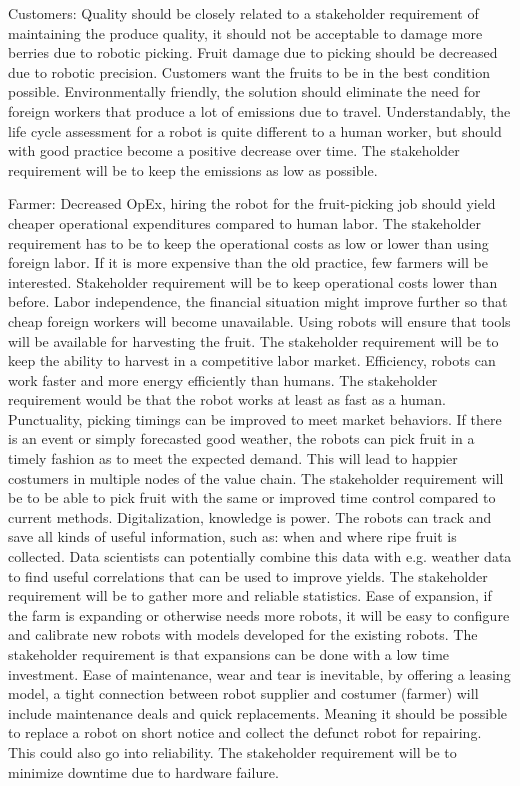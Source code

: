\documentclass[%
oneside,    %
project,    %
nosummary   %
]{USN-MSc}
\begin{document}
Customers:
Quality should be closely related to a stakeholder requirement of maintaining the produce quality, it should not be acceptable to damage more berries due to robotic picking. Fruit damage due to picking should be decreased due to robotic precision. Customers want the fruits to be in the best condition possible.
Environmentally friendly, the solution should eliminate the need for foreign workers that produce a lot of emissions due to travel. Understandably, the life cycle assessment for a robot is quite different to a human worker, but should with good practice become a positive decrease over time. The stakeholder requirement will be to keep the emissions as low as possible.

Farmer:
Decreased OpEx, hiring the robot for the fruit-picking job should yield cheaper operational expenditures compared to human labor. The stakeholder requirement has to be to keep the operational costs as low or lower than using foreign labor. If it is more expensive than the old practice, few farmers will be interested. Stakeholder requirement will be to keep operational costs lower than before.
Labor independence, the financial situation might improve further so that cheap foreign workers will become unavailable. Using robots will ensure that tools will be available for harvesting the fruit. The stakeholder requirement will be to keep the ability to harvest in a competitive labor market.
Efficiency, robots can work faster and more energy efficiently than humans. The stakeholder requirement would be that the robot works at least as fast as a human.
Punctuality, picking timings can be improved to meet market behaviors. If there is an event or simply forecasted good weather, the robots can pick fruit in a timely fashion as to meet the expected demand. This will lead to happier costumers in multiple nodes of the value chain. The stakeholder requirement will be to be able to pick fruit with the same or improved time control compared to current methods.
Digitalization, knowledge is power. The robots can track and save all kinds of useful information, such as: when and where ripe fruit is collected. Data scientists can potentially combine this data with e.g. weather data to find useful correlations that can be used to improve yields. The stakeholder requirement will be to gather more and reliable statistics.
Ease of expansion, if the farm is expanding or otherwise needs more robots, it will be easy to configure and calibrate new robots with models developed for the existing robots. The stakeholder requirement is that expansions can be done with a low time investment.
Ease of maintenance, wear and tear is inevitable, by offering a leasing model, a tight connection between robot supplier and costumer (farmer) will include maintenance deals and quick replacements. Meaning it should be possible to replace a robot on short notice and collect the defunct robot for repairing. This could also go into reliability. The stakeholder requirement will be to minimize downtime due to hardware failure.
\end{document}
